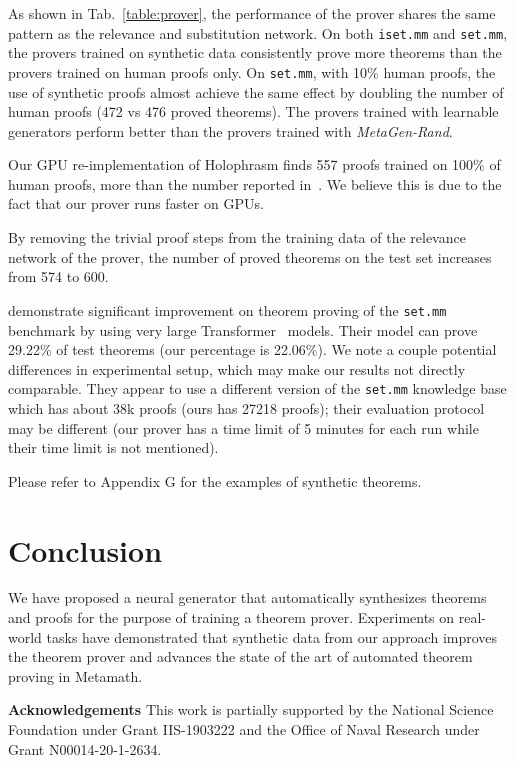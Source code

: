 \documentclass{article}
\begin{document}
As shown in Tab.~\ref{table:prover},
the performance of the prover shares the same pattern as the relevance and substitution network.
On both \texttt{iset.mm} and \texttt{set.mm}, the provers trained on synthetic data
consistently prove more theorems 
than the provers trained on human proofs only.
On \texttt{set.mm}, with 10\% human proofs, the use of synthetic proofs almost achieve the same effect by doubling the number of human proofs (472 vs 476 proved theorems). 
The provers trained with learnable generators perform 
better than the provers trained with \textit{MetaGen-Rand}.

Our GPU re-implementation of Holophrasm finds 557 proofs trained on 100\% of human proofs, more than the number reported in~\citet{whalen2016holophrasm}.
We believe this is due to the fact that our prover runs faster on GPUs. 

By removing the trivial proof steps from the training data of the relevance network of the prover, 
the number of proved theorems on the test set increases from 574 to 600.

\citet{polu2020generative}
demonstrate significant improvement on theorem proving of the \texttt{set.mm} benchmark by using very large Transformer~\citep{vaswani2017attention} models. Their model can prove 29.22\% of test theorems (our percentage is 22.06\%). We note a couple potential differences in experimental setup, which may make our results not directly comparable. They appear to use a different version of the \texttt{set.mm} knowledge base which has about 38k proofs (ours has 27218 proofs); their  evaluation protocol may be different (our prover has a time limit of 5 minutes for each run while their time limit is not mentioned). 

Please refer to Appendix G for the examples of synthetic theorems.

\section{Conclusion}
We have proposed a neural generator that automatically synthesizes theorems and proofs for the purpose of training a theorem prover. Experiments on real-world  tasks have demonstrated that synthetic data from our approach improves the theorem prover and advances the state of the art of automated theorem proving in Metamath.

\noindent\textbf{Acknowledgements} This work is partially supported by the National Science Foundation under Grant IIS-1903222 and the Office of Naval Research under Grant N00014-20-1-2634. 
\end{document}
